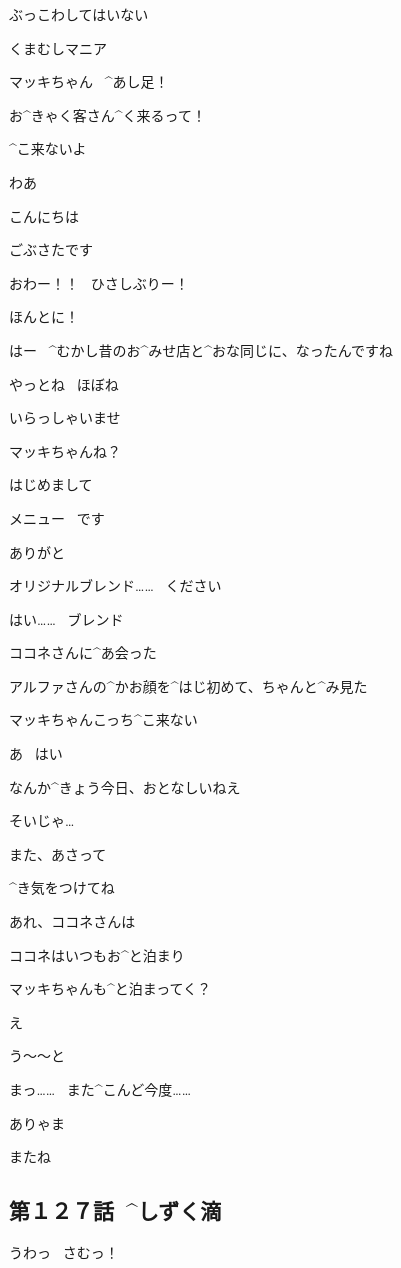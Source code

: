 \A ぶっこわしてはいない

\page
\Sign くまむしマニア

\A マッキちゃん
\ ^{あし}{足}！

\A お^{きゃく}{客}さん^{く}{来}るって！

\M ^{こ}{来}ないよ

\page[88]
\A わあ

\K こんにちは

\K ごぶさたです

\A おわー！！
\ ひさしぶりー！

\K ほんとに！

\page
\K はー
\ ^{むかし}{昔}のお^{みせ}{店}と^{おな}{同}じに、なったんですね

\A やっとね
\ ほぼね

\page
\M いらっしゃいませ

\K マッキちゃんね？

\K はじめまして

\page
\M メニュー
\ です

\K ありがと

\page
\K オリジナルブレンド……
\ ください

\M はい……
\ ブレンド

\page[95]
\M ココネさんに^{あ}{会}った

\M アルファさんの^{かお}{顔}を^{はじ}{初}めて、ちゃんと^{み}{見}た

\K マッキちゃんこっち^{こ}{来}ない

\M あ
\ はい

\A なんか^{きょう}{今日}、おとなしいねえ

\page
\M そいじゃ…

\A また、あさって

\K ^{き}{気}をつけてね

\M あれ、ココネさんは

\A ココネはいつもお^{と}{泊}まり

\A マッキちゃんも^{と}{泊}まってく？

\M え

\page
\M う〜〜と

\M まっ……
\ また^{こんど}{今度}……

\A ありゃま

\K またね


\subsection{第１２７話\ ^{しずく}{滴}}

\page[101]
\A うわっ
\ さむっ！

